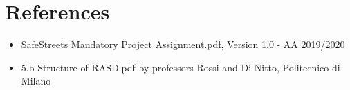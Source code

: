 \documentclass[../RASD.tex]{subfiles}
\begin{document}
    \chapter{References}\label{ch:references}
    \begin{itemize}
        \item SafeStreets Mandatory Project Assignment.pdf,  Version
        1.0 - AA 2019/2020
        \item 5.b Structure of RASD.pdf by professors Rossi and Di Nitto, Politecnico di Milano
    \end{itemize}
\end{document}
